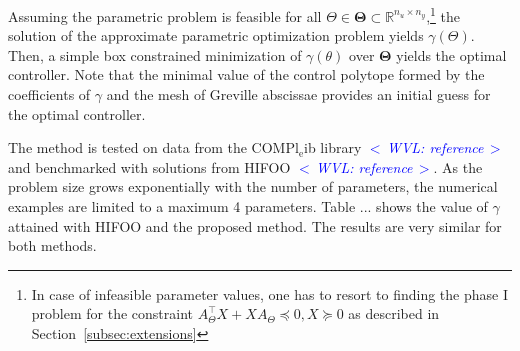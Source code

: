 \documentclass{article}
\DeclareMathOperator*{\minimize}{minimize}
\DeclareMathOperator*{\subj}{subject\;to}
\newcommand{\commentWVL}[1]{\noindent \textcolor{blue}{\emph{$<\,$WVL: #1$\,>$}}}%
\newcommand{\R}{\mathbb{R}}         %
\renewcommand{\t}{\intercal}        %
\newcommand{\feas}{\mathrm{f}}              %
\newcommand{\ppar}{\theta}                          %
\newcommand{\Ppar}{{\bm{\theta}}}                   %
\newcommand{\pPar}{\Theta}                          %
\newcommand{\PPar}{{\bm{\Theta}}}                   %
\newcommand{\Pfeas}{\Ppar^\Pi_\feas}                %
\begin{document}
Assuming the parametric problem is feasible for all $\pPar \in \PPar \subset
\R ^{n_u \times n_y}$,\footnote {In case of infeasible parameter values, one
has to resort to finding the phase I problem for the constraint $A_\pPar^\t X
+ X A_\pPar \preceq 0, X \succeq 0$ as described in
Section~\ref{subsec:extensions}} the solution of the approximate parametric
optimization problem yields $\gamma (\pPar)$. Then, a simple box constrained
minimization of $\gamma(\theta)$ over $\PPar$ yields the optimal controller.
Note that the minimal value of the control polytope formed by the
coefficients of $\gamma$ and the mesh of Greville abscissae provides an
initial guess for the optimal controller.

The method is tested on data from the COMPl$_\text{e}$ib library
\commentWVL{ reference} and benchmarked with solutions from HIFOO
\commentWVL{reference}. As the problem size grows exponentially with the number of
parameters, the numerical examples are limited to a maximum 4 parameters. Table
... shows the value of $\gamma$ attained with HIFOO and the proposed method.
The results are very similar for both methods.




\end{document}
